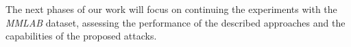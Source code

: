 \documentclass[conference]{IEEEtran} %
\begin{document}
    The next phases of our work will focus on continuing the experiments with the \textit{MMLAB} dataset, assessing the performance of the described approaches and the capabilities of the proposed attacks.

\end{document}
